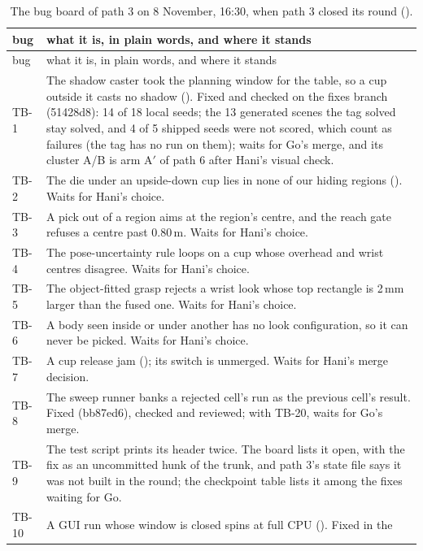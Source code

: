 \begin{small}
\begin{longtable}{@{}P{1.35cm}P{0.78\textwidth}@{}}
\caption[The bug board of path 3 on 8 November.]{The bug board of path 3 on 8 November,
16:30, when path 3 closed its round ().}\label{tab:board}\\
\toprule
bug & what it is, in plain words, and where it stands \\
\midrule
\endfirsthead
\toprule
bug & what it is, in plain words, and where it stands \\
\midrule
\endhead
\bottomrule
\endfoot
TB-1 & The shadow caster took the planning window for the table, so a cup outside it
casts no shadow (). Fixed and checked on the fixes branch (51428d8): 14 of 18
local seeds; the 13 generated scenes the tag solved stay solved, and 4 of 5 shipped seeds
were not scored, which count as failures (the tag has no run on them); waits for Go's merge, and its cluster A/B is arm A$'$ of path 6 after
Hani's visual check. \\
TB-2 & The die under an upside-down cup lies in none of our hiding regions ().
Waits for Hani's choice. \\
TB-3 & A pick out of a region aims at the region's centre, and the reach gate refuses a
centre past 0.80\,m. Waits for Hani's choice. \\
TB-4 & The pose-uncertainty rule loops on a cup whose overhead and wrist centres
disagree. Waits for Hani's choice. \\
TB-5 & The object-fitted grasp rejects a wrist look whose top rectangle is 2\,mm larger
than the fused one. Waits for Hani's choice. \\
TB-6 & A body seen inside or under another has no look configuration, so it can never be
picked. Waits for Hani's choice. \\
TB-7 & A cup release jam (); its switch is unmerged. Waits for Hani's merge
decision. \\
TB-8 & The sweep runner banks a rejected cell's run as the previous cell's result. Fixed
(bb87ed6), checked and reviewed; with TB-20, waits for Go's merge. \\
TB-9 & The test script prints its header twice. The board lists it open, with the fix as
an uncommitted hunk of the trunk, and path 3's state file says it was not built in the round; the checkpoint table lists it among the fixes waiting
for Go. \\
TB-10 & A GUI run whose window is closed spins at full CPU (). Fixed in the

\end{longtable}
\end{small}
